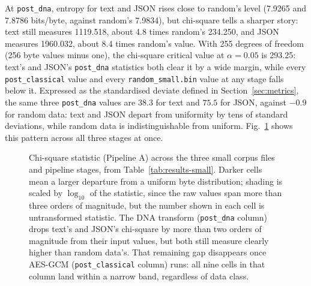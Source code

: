 \documentclass[12pt,a4paper,twoside]{report}
\numberwithin{equation}{chapter}
\begin{document}
At \texttt{post\_dna}, entropy for text and JSON rises close to
random's level (7.9265 and 7.8786 bits/byte, against random's 7.9834),
but chi-square tells a sharper story: text still measures 1119.518,
about 4.8 times random's 234.250, and JSON measures 1960.032, about 8.4
times random's value. With 255 degrees of freedom (256 byte values
minus one), the chi-square critical value at $\alpha=0.05$ is 293.25:
text's and JSON's \texttt{post\_dna} statistics both clear it by a wide
margin, while every \texttt{post\_classical} value and every
\texttt{random\_small.bin} value at any stage falls below it. Expressed
as the standardised deviate defined in Section~\ref{sec:metrics}, the
same three \texttt{post\_dna} values are $38.3$ for text and $75.5$ for
JSON, against $-0.9$ for random data: text and JSON depart from
uniformity by tens of standard deviations, while random data is
indistinguishable from uniform. Fig.~\ref{fig:chisquare-heatmap} shows this
pattern across all three stages at once.

\begin{figure}[H]
\centering
{}
\caption{Chi-square statistic (Pipeline A) across the three small
corpus files and pipeline stages, from Table~\ref{tab:results-small}.
Darker cells mean a larger departure from a uniform byte distribution;
shading is scaled by $\log_{10}$ of the statistic, since the raw values
span more than three orders of magnitude, but the number shown in each
cell is untransformed statistic. The DNA transform
(\texttt{post\_dna} column) drops text's and JSON's chi-square by more
than two orders of magnitude from their input values, but both still
measure clearly higher than random data's. That remaining gap
disappears once AES-GCM (\texttt{post\_classical} column) runs: all
nine cells in that column land within a narrow band, regardless of
data class.}
\label{fig:chisquare-heatmap}
\end{figure}
\end{document}

